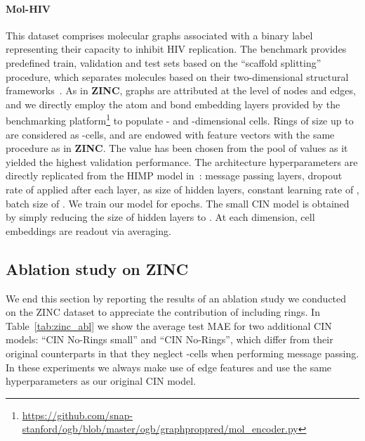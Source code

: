 \documentclass{article}
\begin{document}
\paragraph{Mol-HIV} This dataset comprises  molecular graphs associated with a binary label representing their capacity to inhibit HIV replication. The benchmark provides predefined train, validation and test sets based on the ``scaffold splitting'' procedure, which separates molecules based on their two-dimensional structural frameworks~\citep{hu2020open}. As in \textbf{ZINC}, graphs are attributed at the level of nodes and edges, and we directly employ the atom and bond embedding layers provided by the benchmarking platform\footnote{\url{https://github.com/snap-stanford/ogb/blob/master/ogb/graphproppred/mol_encoder.py}} to populate - and -dimensional cells. Rings of size up to  are considered as -cells, and are endowed with feature vectors with the same procedure as in \textbf{ZINC}. The value  has been chosen from the pool of values  as it yielded the highest validation performance. The architecture hyperparameters are directly replicated from the HIMP model in~\citet{Fey2020_himp}:  message passing layers, dropout rate of  applied after each layer,  as size of hidden layers, constant learning rate of , batch size of . We train our model for  epochs. The small CIN model is obtained by simply reducing the size of hidden layers to . At each dimension, cell embeddings are readout via averaging.

\subsection{Ablation study on ZINC}

We end this section by reporting the results of an ablation study we conducted on the ZINC dataset to appreciate the contribution of including rings. In Table~\ref{tab:zinc_abl} we show the average test MAE for two additional CIN models: ``CIN No-Rings small'' and ``CIN No-Rings'', which differ from their original counterparts in that they neglect -cells when performing message passing. In these experiments we always make use of edge features and use the same hyperparameters as our original CIN model. 
\end{document}
